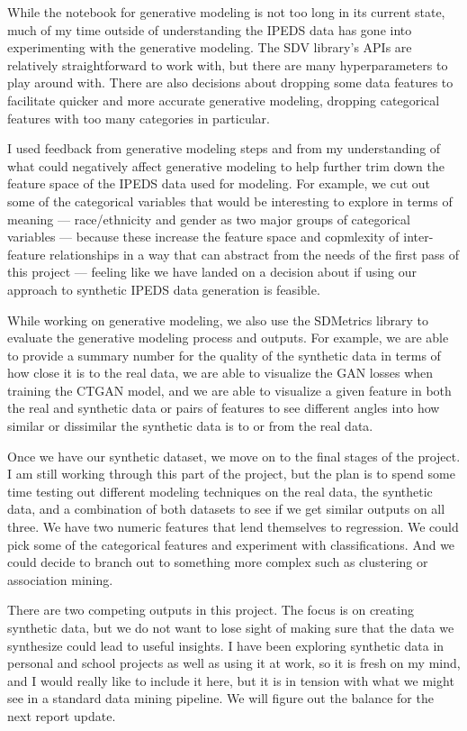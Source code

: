 \documentclass[sigconf, authorversion, nonacm]{acmart}
\begin{document}
        While the notebook for generative modeling is not too long in its current state, much of my time outside of understanding the IPEDS data has gone into experimenting with the generative modeling. The SDV library's APIs are relatively straightforward to work with, but there are many hyperparameters to play around with. There are also decisions about dropping some data features to facilitate quicker and more accurate generative modeling, dropping categorical features with too many categories in particular.

        I used feedback from generative modeling steps and from my understanding of what could negatively affect generative modeling to help further trim down the feature space of the IPEDS data used for modeling. For example, we cut out some of the categorical variables that would be interesting to explore in terms of meaning --- race/ethnicity and gender as two major groups of categorical variables --- because these increase the feature space and copmlexity of inter-feature relationships in a way that can abstract from the needs of the first pass of this project --- feeling like we have landed on a decision about if using our approach to synthetic IPEDS data generation is feasible.

        While working on generative modeling, we also use the SDMetrics library to evaluate the generative modeling process and outputs. For example, we are able to provide a summary number for the quality of the synthetic data in terms of how close it is to the real data, we are able to visualize the GAN losses when training the CTGAN model, and we are able to visualize a given feature in both the real and synthetic data or pairs of features to see different angles into how similar or dissimilar the synthetic data is to or from the real data.

        Once we have our synthetic dataset, we move on to the final stages of the project. I am still working through this part of the project, but the plan is to spend some time testing out different modeling techniques on the real data, the synthetic data, and a combination of both datasets to see if we get similar outputs on all three. We have two numeric features that lend themselves to regression. We could pick some of the categorical features and experiment with classifications. And we could decide to branch out to something more complex such as clustering or association mining.

        There are two competing outputs in this project. The focus is on creating synthetic data, but we do not want to lose sight of making sure that the data we synthesize could lead to useful insights. I have been exploring synthetic data in personal and school projects as well as using it at work, so it is fresh on my mind, and I would really like to include it here, but it is in tension with what we might see in a standard data mining pipeline. We will figure out the balance for the next report update.
\end{document}
